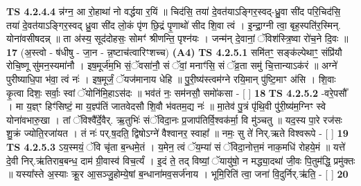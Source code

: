 \documentclass[17pt]{extarticle}
\begin{document}
                  \newline
                                \textbf{ TS 4.2.4.4} \newline
                  न्न॑ग्न॒ आ रो॒हाथा॑ नो वर्द्धया र॒यिं ॥ चिद॑सि॒ तया॑ दे॒वत॑याऽङ्गिर॒स्वद्-ध्रु॒वा सी॑द परि॒चिद॑सि॒ तया॑ दे॒वत॑याऽङ्गिर॒स्वद् ध्रु॒वा सी॑द लो॒कं पृ॑ण छि॒द्रं पृ॒णाथो॑ सीद शि॒वा त्वं । इ॒न्द्रा॒ग्नी त्वा॒ बृह॒स्पति॑र॒स्मिन्. योना॑वसीषदन्न् ॥ ता अ॑स्य॒ सूद॑दोहसः॒ सोमꣳ॑ श्रीणन्ति॒ पृश्न॑यः । जन्म॑न् दे॒वानां॒ ॅविश॑स्त्रि॒ष्वा रो॑च॒ने दि॒वः ॥ \textbf{  17} \newline
                  \newline
                      (अ॒स्त्वो - ष॑धीषु - जा॒न - न्न॒ष्टाच॑त्वारिꣳशच्च)  \textbf{(A4)} \newline \newline
                                        \textbf{ TS 4.2.5.1} \newline
                  समि॑तꣳ॒॒ सङ्क॑ल्पेथाꣳ॒॒ संप्रि॑यौ रोचि॒ष्णू सु॑मन॒स्यमा॑नौ । इष॒मूर्ज॑म॒भि सं॒ॅवसा॑नौ॒ सं ॅवां॒ मनाꣳ॑सि॒ सं ॅव्र॒ता समु॑ चि॒त्तान्याऽक॑रं ॥ अग्ने॑ पुरीष्याधि॒पा भ॑वा॒ त्वं नः॑ । इष॒मूर्जं॒ ॅयज॑मानाय धेहि ॥ पु॒री॒ष्य॑स्त्वम॑ग्ने रयि॒मान् पु॑ष्टि॒माꣳ अ॑सि । शि॒वाः कृ॒त्वा दिशः॒ सर्वाः॒ स्वां ॅयोनि॑मि॒हाऽस॑दः ॥ भव॑तं नः॒ सम॑नसौ॒ समो॑कसा - [  ] \textbf{  18} \newline
                  \newline
                                \textbf{ TS 4.2.5.2} \newline
                  -वरे॒पसौ᳚ । मा य॒ज्ञ्ꣳ हिꣳ॑सिष्टं॒ मा य॒ज्ञ्प॑तिं जातवेदसौ शि॒वौ भ॑वतम॒द्य नः॑ ॥ मा॒तेव॑ पु॒त्रं पृ॑थि॒वी पु॑री॒ष्य॑म॒ग्निꣳ स्वे योना॑वभारु॒खा । तां ॅविश्वै᳚र्दे॒वैर्. ऋ॒तुभिः॑ संॅविदा॒नः प्र॒जाप॑तिर्वि॒श्वक॑र्मा॒ वि मु॑ञ्चतु ॥ यद॒स्य पा॒रे रज॑सः शु॒क्रं ज्योति॒रजा॑यत । तं नः॑ पर्.ष॒दति॒ द्विषोऽग्ने॑ वैश्वानर॒ स्वाहा᳚ ॥ नमः॒ सु ते॑ निर्.ऋते विश्वरूपे - [  ] \textbf{  19} \newline
                  \newline
                                \textbf{ TS 4.2.5.3} \newline
                  ऽय॒स्मयं॒ ॅवि चृ॑ता ब॒न्धमे॒तं । य॒मेन॒ त्वं ॅय॒म्या॑ सं ॅविदा॒नोत्त॒मं नाक॒मधि॑ रोहये॒मं ॥ यत्ते॑ दे॒वी निर्.ऋ॑तिराब॒बन्ध॒ दाम॑ ग्री॒वास्व॑ विच॒र्त्यं । इ॒दं ते॒ तद् विष्यां॒ ॅयायु॑षो॒ न मद्ध्या॒दथा॑ जी॒वः पि॒तुम॑द्धि॒ प्रमु॑क्तः ॥ यस्या᳚स्ते अ॒स्याः क्रू॒र आ॒सञ्जु॒होम्ये॒षां ब॒न्धाना॑मव॒सर्ज॑नाय । भूमि॒रिति॑ त्वा॒ जना॑ वि॒दुर्निर्.ऋ॑ति॒ - [  ] \textbf{  20} \newline
                  \newline
\end{document}
